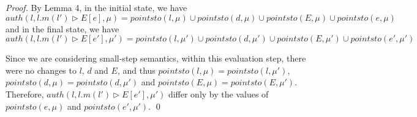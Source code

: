 \documentclass{llncs}
\begin{document}
\begin{proof} By Lemma 4, in the initial state, we have
\[
auth(l, l.m(l') \rhd E[e], \mu) = pointsto(l, \mu) \cup pointsto(d, \mu) \cup pointsto(E, \mu) \cup pointsto(e, \mu)
\]
and in the final state, we have
\[
auth(l, l.m(l') \rhd E[e'], \mu') = pointsto(l, \mu') \cup pointsto(d, \mu') \cup pointsto(E, \mu') \cup pointsto(e', \mu')
\]

Since we are considering small-step semantics, within this evaluation step, there were no changes to $l$, $d$ and $E$, and thus $pointsto(l, \mu) = pointsto(l, \mu')$, $pointsto(d, \mu) = pointsto(d, \mu')$ and $pointsto(E, \mu) = pointsto(E, \mu')$. Therefore, $auth(l, l.m(l') \rhd E[e'], \mu')$ differ only by the values of $pointsto(e, \mu)$ and $pointsto(e', \mu')$. \qed

\end{proof}

\newpage
\end{document}
